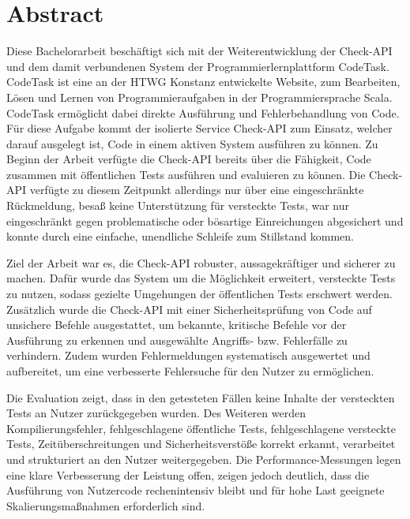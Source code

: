 \chapter*{Abstract}

Diese Bachelorarbeit beschäftigt sich mit der Weiterentwicklung der Check-API und dem damit verbundenen System der Programmierlernplattform CodeTask. CodeTask ist eine an der HTWG Konstanz entwickelte Website, zum Bearbeiten, Lösen und Lernen von Programmieraufgaben in der Programmiersprache Scala. CodeTask ermöglicht dabei direkte Ausführung und Fehlerbehandlung von Code. Für diese Aufgabe kommt der isolierte Service Check-API zum Einsatz, welcher darauf ausgelegt ist, Code in einem aktiven System ausführen zu können. Zu Beginn der Arbeit verfügte die Check-API bereits über die Fähigkeit, Code zusammen mit öffentlichen Tests ausführen und evaluieren zu können. Die Check-API verfügte zu diesem Zeitpunkt allerdings nur über eine eingeschränkte Rückmeldung, besaß keine Unterstützung für versteckte Tests, war nur eingeschränkt gegen problematische oder bösartige Einreichungen abgesichert und konnte durch eine einfache, unendliche Schleife zum Stillstand kommen.

Ziel der Arbeit war es, die Check-API robuster, aussagekräftiger und sicherer zu machen. Dafür wurde das System um die Möglichkeit erweitert, versteckte Tests zu nutzen, sodass gezielte Umgehungen der öffentlichen Tests erschwert werden. Zusätzlich wurde die Check-API mit einer Sicherheitsprüfung von Code auf unsichere Befehle ausgestattet, um bekannte, kritische Befehle vor der Ausführung zu erkennen und ausgewählte Angriffs- bzw. Fehlerfälle zu verhindern. Zudem wurden Fehlermeldungen systematisch ausgewertet und aufbereitet, um eine verbesserte Fehlersuche für den Nutzer zu ermöglichen.

Die Evaluation zeigt, dass in den getesteten Fällen keine Inhalte der versteckten Tests an Nutzer zurückgegeben wurden. Des Weiteren werden Kompilierungsfehler, fehlgeschlagene öffentliche Tests, fehlgeschlagene versteckte Tests, Zeitüberschreitungen und Sicherheitsverstöße korrekt erkannt, verarbeitet und strukturiert an den Nutzer weitergegeben. Die Performance-Messungen legen eine klare Verbesserung der Leistung offen, zeigen jedoch deutlich, dass die Ausführung von Nutzercode rechenintensiv bleibt und für hohe Last geeignete Skalierungsmaßnahmen erforderlich sind.